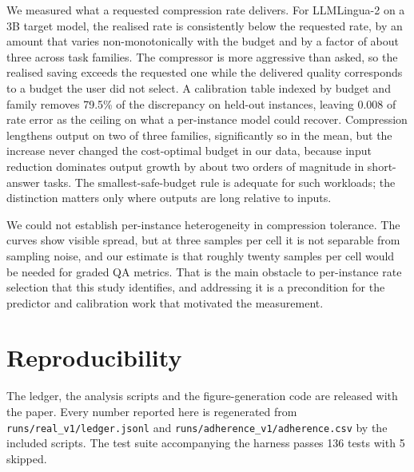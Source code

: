 \documentclass[conference]{IEEEtran}
\begin{document}
We measured what a requested compression rate delivers. For LLMLingua-2 on a
3B target model, the realised rate is consistently below the requested rate,
by an amount that varies non-monotonically with the budget and by a factor of
about three across task families. The compressor is more aggressive than
asked, so the realised saving exceeds the requested one while the delivered
quality corresponds to a budget the user did not select. A calibration table
indexed by budget and family removes 79.5\% of the discrepancy on held-out
instances, leaving 0.008 of rate error as the ceiling on what a per-instance
model could recover. Compression lengthens output on two
of three families, significantly so in the mean, but the increase never
changed the cost-optimal budget in our data, because input reduction dominates
output growth by about two orders of magnitude in short-answer tasks. The
smallest-safe-budget rule is adequate for such workloads; the distinction
matters only where outputs are long relative to inputs.

We could not establish per-instance heterogeneity in compression tolerance.
The curves show visible spread, but at three samples per cell it is not
separable from sampling noise, and our estimate is that roughly twenty samples
per cell would be needed for graded QA metrics. That is the main obstacle to
per-instance rate selection that this study identifies, and addressing it is a
precondition for the predictor and calibration work that motivated the
measurement.

\section*{Reproducibility}

The ledger, the analysis scripts and the figure-generation code are released
with the paper. Every number reported here is regenerated from
\texttt{runs/real\_v1/ledger.jsonl} and
\texttt{runs/adherence\_v1/adherence.csv} by the included scripts. The test
suite accompanying the harness passes 136 tests with 5 skipped.



\end{document}
